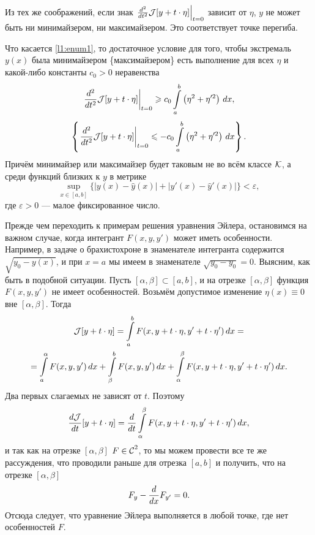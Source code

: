Из тех же соображений, если знак $\left.\dder{}{t}\J[y+t\cdot\eta]\right|_{t=0}$ зависит от $\eta$,  $y$ не может быть ни минимайзером, ни максимайзером. Это соответствует точке перегиба.   

Что касается \ref{l1:enum1}, то достаточное условие для того, чтобы экстремаль $y(x)$ была минимайзером \{максимайзером\} есть выполнение для всех $\eta$ и какой-либо константы $c_0>0$ неравенства
\begin{equation*}
	\left.\dder{}{t}\J[y+t\cdot\eta]\right|_{t=0}\geqslant c_0\int\limits_a^b\left(\eta^2+\eta^{\prime 2}\right)\,\dd{x},
\end{equation*}
\begin{equation*}
	\left\{\left.\dder{}{t}\J[y+t\cdot\eta]\right|_{t=0}\leqslant -c_0\int\limits_a^b\left(\eta^2+\eta^{\prime 2}\right)\,\dd{x}\right\}.
\end{equation*} 
Причём минимайзер или максимайзер {\mb будет таковым} не во всём классе $\mc{K}$, а среди функций близких к $y$ в метрике
\begin{equation*}
	\sup\limits_{x\in{[a,b]}}\{|y(x)-\hat{y}(x)|+|y'(x)-\hat{y}'(x)|\}<\varepsilon,
\end{equation*} 
где $\varepsilon>0$ --- малое фиксированное число.

Прежде чем переходить к примерам решения уравнения Эйлера, остановимся на важном случае, когда интегрант $F(x,y,y')$ может иметь особенности. Например, в задаче о брахистохроне в знаменателе интегранта содержится $\sqrt{y_0-y(x)}$, и при $x=a$ мы имеем в знаменателе $\sqrt{y_0-y_0}=0$. Выясним, как быть в подобной ситуации. Пусть $[\alpha,\beta]\subset[a,b]$, и на отрезке $[\alpha,\beta]$ функция $F(x,y,y')$ не имеет особенностей. Возьмём допустимое изменение $\eta(x)\equiv0$ вне $[\alpha,\beta]$. Тогда 
\begin{multline*}
	\J[y+t\cdot\eta]=\int\limits_a^b F(x,y+t\cdot\eta,y'+t\cdot\eta')\,\dd{x}=\\=\int\limits_a^\alpha F(x,y,y')\,\dd{x}+\int\limits_{\beta}^b F(x,y,y')\,\dd{x}+\int\limits_{\alpha}^{\beta} F(x,y+t\cdot\eta,y'+t\cdot\eta')\,\dd{x}.
\end{multline*} 
Два первых слагаемых не зависят от $t$. Поэтому
\begin{equation*}
	\der{\J}{t}[y+t\cdot\eta]=\der{}{t}\int\limits_{\alpha}^{\beta} F(x,y+t\cdot\eta,y'+t\cdot\eta')\,\dd{x},
\end{equation*} 
и так как на отрезке $[\alpha,\beta]$ $F\in\Cfn[]{2}$, то мы можем провести все те же рассуждения, что проводили раньше для отрезка $[a,b]$ и получить, что на отрезке $[\alpha,\beta]$
\begin{equation*}
	F_y-\der{}{x}F_{y'}=0.
\end{equation*} 
Отсюда следует, что уравнение Эйлера выполняется в любой точке, где нет особенностей $F$. 

